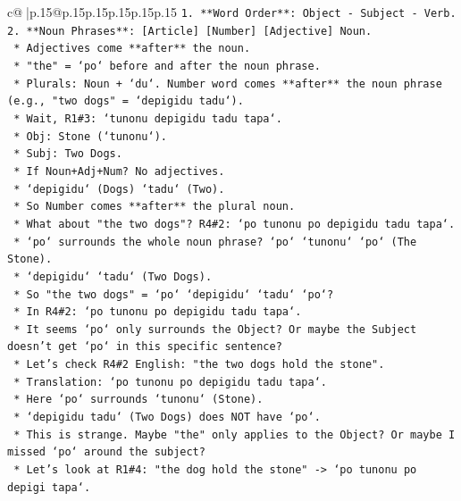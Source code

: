 \documentclass{article}
\begin{document}
{\begin{supertabular}{c@{$\;$}|p{.15\linewidth}@{}p{.15\linewidth}p{.15\linewidth}p{.15\linewidth}p{.15\linewidth}p{.15\linewidth}}
{{{\texttt{1.  **Word Order**: Object {-} Subject {-} Verb.} \\
\texttt{2.  **Noun Phrases**: {[}Article{]} {[}Number{]} {[}Adjective{]} Noun.} \\
\texttt{    *   Adjectives come **after** the noun.} \\
\texttt{    *   "the" = `po` before and after the noun phrase.} \\
\texttt{    *   Plurals: Noun + `du`. Number word comes **after** the noun phrase (e.g., "two dogs" = `depigidu tadu`).} \\
\texttt{    *   Wait, R1\#3: `tunonu depigidu tadu tapa`.} \\
\texttt{        *   Obj: Stone (`tunonu`).} \\
\texttt{        *   Subj: Two Dogs.} \\
\texttt{        *   If Noun+Adj+Num? No adjectives.} \\
\texttt{        *   `depigidu` (Dogs) `tadu` (Two).} \\
\texttt{        *   So Number comes **after** the plural noun.} \\
\texttt{        *   What about "the two dogs"? R4\#2: `po tunonu po depigidu tadu tapa`.} \\
\texttt{        *   `po` surrounds the whole noun phrase? `po` `tunonu` `po` (The Stone).} \\
\texttt{        *   `depigidu` `tadu` (Two Dogs).} \\
\texttt{        *   So "the two dogs" = `po` `depigidu` `tadu` `po`?} \\
\texttt{        *   In R4\#2: `po tunonu po depigidu tadu tapa`.} \\
\texttt{        *   It seems `po` only surrounds the Object? Or maybe the Subject doesn't get `po` in this specific sentence?} \\
\texttt{        *   Let's check R4\#2 English: "the two dogs hold the stone".} \\
\texttt{        *   Translation: `po tunonu po depigidu tadu tapa`.} \\
\texttt{        *   Here `po` surrounds `tunonu` (Stone).} \\
\texttt{        *   `depigidu tadu` (Two Dogs) does NOT have `po`.} \\
\texttt{        *   This is strange. Maybe "the" only applies to the Object? Or maybe I missed `po` around the subject?} \\
\texttt{        *   Let's look at R1\#4: "the dog hold the stone" {-}> `po tunonu po depigi tapa`.} \\
}}}
\end{supertabular}}
\end{document}
